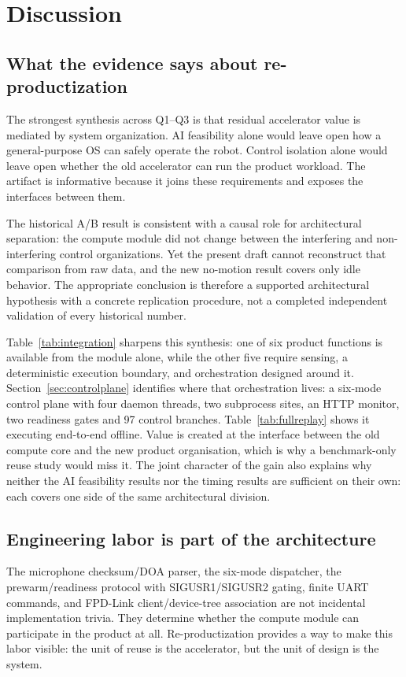 \documentclass[conference]{IEEEtran}
\begin{document}
\section{Discussion}
\subsection{What the evidence says about re-productization}
The strongest synthesis across Q1--Q3 is that residual accelerator value is mediated by system organization. AI feasibility alone would leave open how a general-purpose OS can safely operate the robot. Control isolation alone would leave open whether the old accelerator can run the product workload. The artifact is informative because it joins these requirements and exposes the interfaces between them.

The historical A/B result is consistent with a causal role for architectural separation: the compute module did not change between the interfering and non-interfering control organizations. Yet the present draft cannot reconstruct that comparison from raw data, and the new no-motion result covers only idle behavior. The appropriate conclusion is therefore a supported architectural hypothesis with a concrete replication procedure, not a completed independent validation of every historical number.

Table~\ref{tab:integration} sharpens this synthesis: one of six product functions is available from the module alone, while the other five require sensing, a deterministic execution boundary, and orchestration designed around it. Section~\ref{sec:controlplane} identifies where that orchestration lives: a six-mode control plane with four daemon threads, two subprocess sites, an HTTP monitor, two readiness gates and 97 control branches. Table~\ref{tab:fullreplay} shows it executing end-to-end offline. Value is created at the interface between the old compute core and the new product organisation, which is why a benchmark-only reuse study would miss it. The joint character of the gain also explains why neither the AI feasibility results nor the timing results are sufficient on their own: each covers one side of the same architectural division.

\subsection{Engineering labor is part of the architecture}
The microphone checksum/DOA parser, the six-mode dispatcher, the prewarm/readiness protocol with SIGUSR1/SIGUSR2 gating, finite UART commands, and FPD-Link client/device-tree association are not incidental implementation trivia. They determine whether the compute module can participate in the product at all. Re-productization provides a way to make this labor visible: the unit of reuse is the accelerator, but the unit of design is the system.
\end{document}
